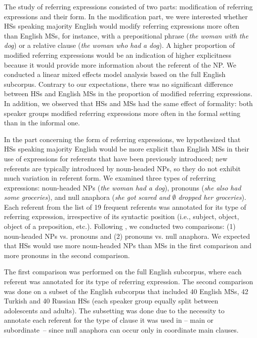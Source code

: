 \documentclass[output=paper,colorlinks,citecolor=brown]{langscibook}
\begin{document}
The study of referring expressions \parencite{pashkovainprep_a} consisted of two parts: modification of referring expressions and their form. In the modification part, we were interested whether HSs speaking majority English would modify referring expressions more often than English MSs, for instance, with a prepositional phrase (\textit{the woman with the dog}) or a relative clause (\textit{the woman who had a dog}). A higher proportion of modified referring expressions would be an indication of higher explicitness because it would provide more information about the referent of the NP. We conducted a linear mixed effects model analysis based on the full English subcorpus. Contrary to our expectations, there was no significant difference between HSs and English MSs in the proportion of modified referring expressions. In addition, we observed that HSs and MSs had the same effect of formality: both speaker groups modified referring expressions more often in the formal setting than in the informal one.

In the part concerning the form of referring expressions, we hypothesized that HSs speaking majority English would be more explicit than English MSs in their use of expressions for referents that have been previously introduced; new referents are typically introduced by noun-headed NPs, so they do not exhibit much variation in referent form. We examined three types of referring expressions: noun-headed NPs (\textit{the woman had a dog}), pronouns (\textit{she also had some groceries}), and null anaphora (\textit{she got scared and ${\emptyset}$ dropped her groceries}). Each referent from the list of 19 frequent referents was annotated for its type of referring expression, irrespective of its syntactic position (i.e., subject, object, object of a preposition, etc.). Following \citet{azar2020reference}, we conducted two comparisons: (1) noun-headed NPs vs. pronouns and (2) pronouns vs. null anaphora. We expected that HSs would use more noun-headed NPs than MSs in the first comparison and more pronouns in the second comparison.

The first comparison was performed on the full English subcorpus, where each referent was annotated for its type of referring expression. The second comparison was done on a subset of the English subcorpus that included 40 English MSs, 42 Turkish and 40 Russian HSs (each speaker group equally split between adolescents and adults). The subsetting was done due to the necessity to annotate each referent for the type of clause it was used in -- main or subordinate~-- since null anaphora can occur only in coordinate main clauses. 
\end{document}

